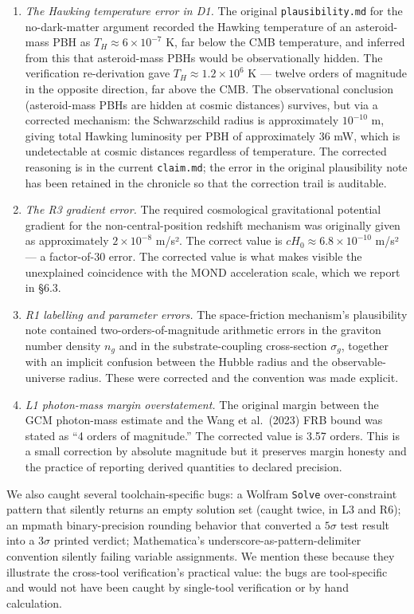 \documentclass[12pt]{article}
\theoremstyle{definition}
\theoremstyle{remark}
\begin{document}
\begin{enumerate}
\def\labelenumi{\arabic{enumi}.}
\item
  \emph{The Hawking temperature error in D1.} The original
  \texttt{plausibility.md} for the no-dark-matter argument recorded the
  Hawking temperature of an asteroid-mass PBH as
  \(T_H \approx 6 \times 10^{-7}\) K, far below the CMB temperature, and
  inferred from this that asteroid-mass PBHs would be observationally
  hidden. The verification re-derivation gave
  \(T_H \approx 1.2 \times 10^6\) K --- twelve orders of magnitude in
  the opposite direction, far above the CMB. The observational
  conclusion (asteroid-mass PBHs are hidden at cosmic distances)
  survives, but via a corrected mechanism: the Schwarzschild radius is
  approximately \(10^{-10}\) m, giving total Hawking luminosity per PBH
  of approximately 36 mW, which is undetectable at cosmic distances
  regardless of temperature. The corrected reasoning is in the current
  \texttt{claim.md}; the error in the original plausibility note has
  been retained in the chronicle so that the correction trail is
  auditable.
\item
  \emph{The R3 gradient error.} The required cosmological gravitational
  potential gradient for the non-central-position redshift mechanism was
  originally given as approximately \(2 \times 10^{-8}\) m/s². The
  correct value is \(cH_0 \approx 6.8 \times 10^{-10}\) m/s² --- a
  factor-of-30 error. The corrected value is what makes visible the
  unexplained coincidence with the MOND acceleration scale, which we
  report in §6.3.
\item
  \emph{R1 labelling and parameter errors.} The space-friction
  mechanism's plausibility note contained two-orders-of-magnitude
  arithmetic errors in the graviton number density \(n_g\) and in the
  substrate-coupling cross-section \(\sigma_g\), together with an
  implicit confusion between the Hubble radius and the
  observable-universe radius. These were corrected and the convention
  was made explicit.
\item
  \emph{L1 photon-mass margin overstatement.} The original margin
  between the GCM photon-mass estimate and the Wang et al.~(2023) FRB
  bound was stated as ``4 orders of magnitude.'' The corrected value is
  3.57 orders. This is a small correction by absolute magnitude but it
  preserves margin honesty and the practice of reporting derived
  quantities to declared precision.
\end{enumerate}

We also caught several toolchain-specific bugs: a Wolfram \texttt{Solve}
over-constraint pattern that silently returns an empty solution set
(caught twice, in L3 and R6); an mpmath binary-precision rounding
behavior that converted a \(5\sigma\) test result into a \(3\sigma\)
printed verdict; Mathematica's underscore-as-pattern-delimiter
convention silently failing variable assignments. We mention these
because they illustrate the cross-tool verification's practical value:
the bugs are tool-specific and would not have been caught by single-tool
verification or by hand calculation.
\end{document}
